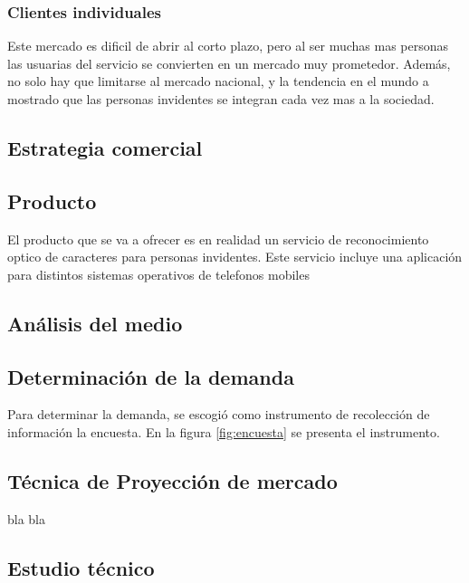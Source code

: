 \documentclass[a4paper, 12pt, oneside]{article}
\begin{document}
	\subsubsection{Clientes individuales}
	Este mercado es dificil de abrir al corto plazo, pero al ser muchas mas personas las usuarias del servicio se convierten en un mercado muy prometedor. Además, no solo hay que limitarse al mercado nacional, y la tendencia en el mundo a mostrado que las personas invidentes se integran cada vez mas a la sociedad.
	
	\subsection{Estrategia comercial}
	 
	\subsection{Producto}
	El producto que se va a ofrecer es en realidad un servicio de reconocimiento optico de caracteres para personas invidentes. Este servicio incluye una aplicación para distintos
	sistemas operativos de telefonos mobiles
	
	\subsection{Análisis del medio}
	
	\subsection{Determinación de la demanda}
	Para determinar la demanda, se escogió como instrumento de recolección de información la encuesta. En la figura \ref{fig:encuesta} se presenta el instrumento.
	
	
	
	\subsection{Técnica de Proyección de mercado}
	bla bla
	
	\clearpage
	
	\begin{center}
	\section{Estudio técnico}
	\end{center}
	
\end{document}

